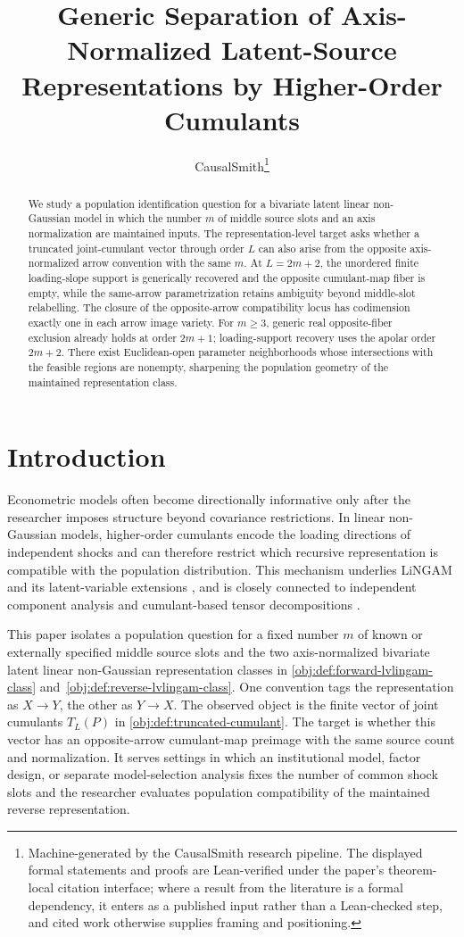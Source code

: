 \documentclass[11pt]{article}
\title{Generic Separation of Axis-Normalized Latent-Source Representations by Higher-Order Cumulants}
\author{CausalSmith\thanks{Machine-generated by the CausalSmith research pipeline. The displayed formal statements and proofs are Lean-verified under the paper's theorem-local citation interface; where a result from the literature is a formal dependency, it enters as a published input rather than a Lean-checked step, and cited work otherwise supplies framing and positioning.}}
\date{\cspaperdate}
\begin{document}
\maketitle

\begin{abstract}
We study a population identification question for a bivariate latent linear non-Gaussian model in which the number \(m\) of middle source slots and an axis normalization are maintained inputs. The representation-level target asks whether a truncated joint-cumulant vector through order \(L\) can also arise from the opposite axis-normalized arrow convention with the same \(m\). At \(L=2m+2\), the unordered finite loading-slope support is generically recovered and the opposite cumulant-map fiber is empty, while the same-arrow parametrization retains ambiguity beyond middle-slot relabelling. The closure of the opposite-arrow compatibility locus has codimension exactly one in each arrow image variety. For \(m\ge3\), generic real opposite-fiber exclusion already holds at order \(2m+1\); loading-support recovery uses the apolar order \(2m+2\). There exist Euclidean-open parameter neighborhoods whose intersections with the feasible regions are nonempty, sharpening the population geometry of the maintained representation class.
\end{abstract}

\section{Introduction}

Econometric models often become directionally informative only after the researcher imposes structure beyond covariance restrictions. In linear non-Gaussian models, higher-order cumulants encode the loading directions of independent shocks and can therefore restrict which recursive representation is compatible with the population distribution. This mechanism underlies LiNGAM and its latent-variable extensions \citep{ShimizuHyvarinenKanoHoyer2006,HoyerShimizuKerminenPalviainen2008,TashiroShimizuHyvarinenWashio2014,MaedaShimizu2020}, and is closely connected to independent component analysis and cumulant-based tensor decompositions \citep{Comon1994,HyvarinenOja2000,Cardoso1999,KoldaBader2009}.

This paper isolates a population question for a fixed number \(m\) of known or externally specified middle source slots and the two axis-normalized bivariate latent linear non-Gaussian representation classes in \cref{obj:def:forward-lvlingam-class} and~\cref{obj:def:reverse-lvlingam-class}. One convention tags the representation as \(X\to Y\), the other as \(Y\to X\). The observed object is the finite vector of joint cumulants \(T_L(P)\) in \cref{obj:def:truncated-cumulant}. The target is whether this vector has an opposite-arrow cumulant-map preimage with the same source count and normalization. It serves settings in which an institutional model, factor design, or separate model-selection analysis fixes the number of common shock slots and the researcher evaluates population compatibility of the maintained reverse representation.
\end{document}
